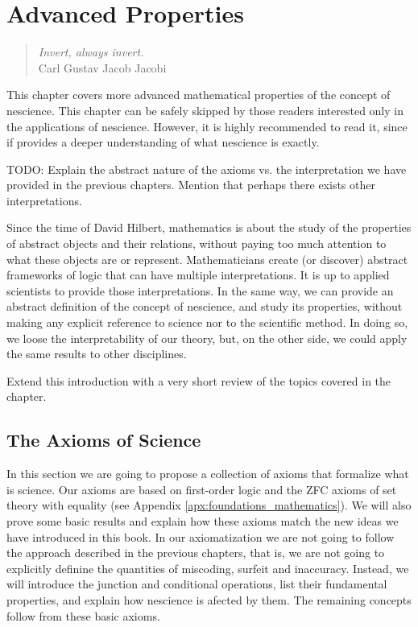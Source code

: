 %
%


\chapter{Advanced Properties}
\label{chap:Properties-Nescience}

\begin{quote}
\begin{flushright}
\emph{Invert, always invert.}\\
Carl Gustav Jacob Jacobi\\
\end{flushright}
\end{quote}
\bigskip

This chapter covers more advanced mathematical properties of the concept of nescience. This chapter can be safely skipped by those readers interested only in the applications of nescience. However, it is highly recommended to read it, since if provides a deeper understanding of what nescience is exactly.

{\color{red} TODO: Explain the abstract nature of the axioms vs. the interpretation we have provided in the previous chapters. Mention that perhaps there exists other interpretations.}

Since the time of David Hilbert, mathematics is about the study of the properties of abstract objects and their relations, without paying too much attention to what these objects are or represent. Mathematicians create (or discover) abstract frameworks of logic that can have multiple interpretations. It is up to applied scientists to provide those interpretations. In the same way, we can provide an abstract definition of the concept of nescience, and study its properties, without making any explicit reference to science nor to the scientific method. In doing so, we loose the interpretability of our theory, but, on the other side, we could apply the same results to other disciplines.

{\color{red} Extend this introduction with a very short review of the topics covered in the chapter.}

%
%

\section{The Axioms of Science}

In this section we are going to propose a collection of axioms that formalize what is science. Our axioms are based on first-order logic and the ZFC axioms of set theory with equality (see Appendix \ref{apx:foundations_mathematics}). We will also prove some basic results and explain how these axioms match the new ideas we have introduced in this book. In our axiomatization we are not going to follow the approach described in the previous chapters, that is, we are not going to explicitly definine the quantities of miscoding, surfeit and inaccuracy. Instead, we will introduce the junction and conditional operations, list their fundamental properties, and explain how nescience is afected by them. The remaining concepts follow from these basic axioms.

